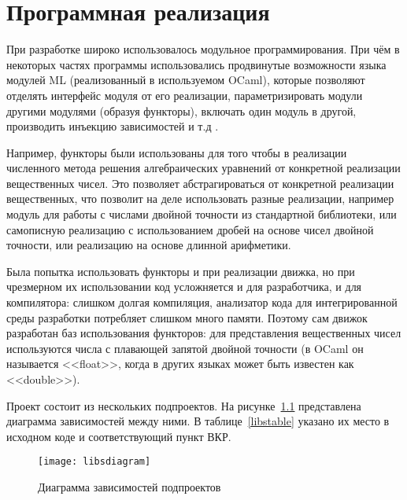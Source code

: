 \chapter{Программная реализация}

При разработке широко использовалось модульное программирования. При чём в некоторых частях программы использовались
продвинутые возможности языка модулей ML (реализованный в используемом OCaml), которые позволяют
отделять интерфейс модуля от его реализации,
параметризировать модули другими модулями (образуя функторы),
включать один модуль в другой, \cite{wiki-mlmodules}
производить инъекцию зависимостей и т.д \cite{functor-driven}.

Например, функторы были использованы для того чтобы в реализации численного метода решения алгебраических уравнений
от конкретной реализации вещественных чисел. Это позволяет абстрагироваться от конкретной реализации вещественных,
что позволит на деле использовать разные реализации, например модуль для работы с числами двойной точности из стандартной библиотеки,
или самописную реализацию с использованием дробей на основе чисел двойной точности, или реализацию на основе длинной арифметики.

Была попытка использовать функторы и при реализации движка, но при чрезмерном их использовании код усложняется и для разработчика,
и для компилятора: слишком долгая компиляция, анализатор кода для интегрированной среды разработки потребляет слишком много памяти.
Поэтому сам движок разработан баз использования функторов: для представления вещественных чисел используются числа
с плавающей запятой двойной точности (в OCaml он называется <<float>>, когда в других языках может быть известен как <<double>>).

Проект состоит из нескольких подпроектов. На рисунке~\ref{libsdiagramfig} представлена диаграмма зависимостей между ними.
В таблице~\ref{libstable} указано их место в исходном коде и соответствующий пункт ВКР.

\pagebreak
\begin{figure}[H]
    \centering
    \texttt{[image: libsdiagram]}
    \caption{Диаграмма зависимостей подпроектов\label{libsdiagramfig}}
\end{figure}


